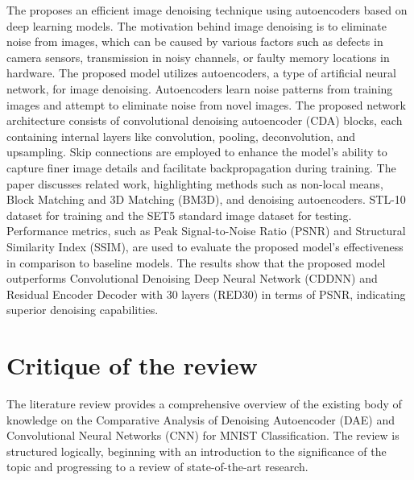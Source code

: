 The \citep{bajaj2020autoencoders} proposes an efficient image denoising technique using autoencoders based on deep learning models. The motivation behind image denoising is to eliminate noise from images, which can be caused by various factors such as defects in camera sensors, transmission in noisy channels, or faulty memory locations in hardware. The proposed model utilizes autoencoders, a type of artificial neural network, for image denoising. Autoencoders learn noise patterns from training images and attempt to eliminate noise from novel images. The proposed network architecture consists of convolutional denoising autoencoder (CDA) blocks, each containing internal layers like convolution, pooling, deconvolution, and upsampling. Skip connections are employed to enhance the model's ability to capture finer image details and facilitate backpropagation during training. The paper discusses related work, highlighting methods such as non-local means, Block Matching and 3D Matching (BM3D), and denoising autoencoders. STL-10 dataset for training and the SET5 standard image dataset for testing. Performance metrics, such as Peak Signal-to-Noise Ratio (PSNR) and Structural Similarity Index (SSIM), are used to evaluate the proposed model's effectiveness in comparison to baseline models. The results show that the proposed model outperforms Convolutional Denoising Deep Neural Network (CDDNN) and Residual Encoder Decoder with 30 layers (RED30) in terms of PSNR, indicating superior denoising capabilities.


\section{Critique of the review} %
The literature review provides a comprehensive overview of the existing body of knowledge on the Comparative Analysis of Denoising Autoencoder (DAE) and Convolutional Neural Networks (CNN) for MNIST Classification. The review is structured logically, beginning with an introduction to the significance of the topic and progressing to a review of state-of-the-art research.

